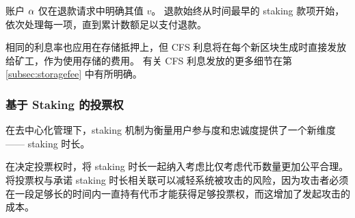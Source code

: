 账户 $\mathbf{\alpha}$ 仅在退款请求中明确其值 $v$。
退款始终从时间最早的 staking 款项开始，依次处理每一项，直到累计数额足以支付退款。

相同的利息率也应用在存储抵押上，但 CFS 利息将在每个新区块生成时直接发放给矿工，作为使用存储的费用。
有关 CFS 利息发放的更多细节在第 \ref{subsec:storagefee} 中有所明确。


\subsubsection{基于 Staking 的投票权}

在去中心化管理下，staking 机制为衡量用户参与度和忠诚度提供了一个新维度 —— staking 时长。

在决定投票权时，将 staking 时长一起纳入考虑比仅考虑代币数量更加公平合理。
将投票权与承诺 staking 时长相关联可以减轻系统被攻击的风险，因为攻击者必须在一段足够长的时间内一直持有代币才能获得足够投票权，而这增加了发起攻击的成本。

